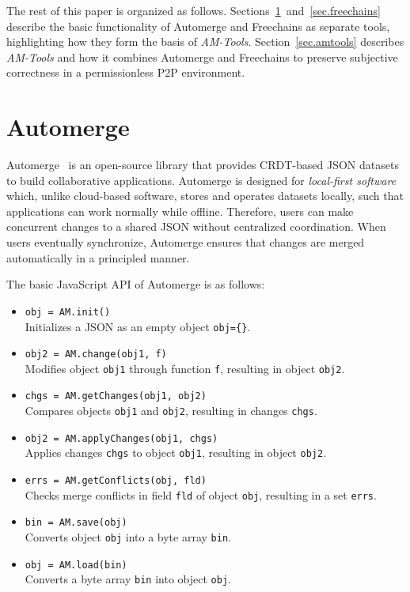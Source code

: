 \documentclass[12pt]{article}
\newcommand{\AMT}      {\emph{AM-Tools}\xspace}
\newcommand{\code}[1]  {\texttt{\footnotesize{#1}}}
\begin{document}
The rest of this paper is organized as follows.
Sections~\ref{sec.automerge}~and~\ref{sec.freechains} describe the basic
functionality of Automerge and Freechains as separate tools, highlighting how
they form the basis of \AMT.
Section~\ref{sec.amtools} describes \AMT and how it combines Automerge and
Freechains to preserve subjective correctness in a permissionless P2P
environment.

\section{Automerge}
\label{sec.automerge}

Automerge~\cite{p2p.automerge} is an open-source library that provides
CRDT-based JSON datasets to build collaborative applications.
%
Automerge is designed for \emph{local-first software}~\cite{p2p.local} which,
unlike cloud-based software, stores and operates datasets locally, such that
applications can work normally while offline.
%
Therefore, users can make concurrent changes to a shared JSON without
centralized coordination.
When users eventually synchronize, Automerge ensures that changes are merged
automatically in a principled manner.
%
%

The basic JavaScript API of Automerge is as follows:

\begin{itemize}
\item \code{obj = AM.init()} \\
    Initializes a JSON as an empty object \code{obj=\{\}}.
\item \code{obj2 = AM.change(obj1, f)} \\
    Modifies object \code{obj1} through function \code{f}, resulting in
    object \code{obj2}.
\item \code{chgs = AM.getChanges(obj1, obj2)} \\
    Compares objects \code{obj1} and \code{obj2}, resulting in changes
    \code{chgs}.
\item \code{obj2 = AM.applyChanges(obj1, chgs)} \\
    Applies changes \code{chgs} to object \code{obj1}, resulting in object
    \code{obj2}.
\item \code{errs = AM.getConflicts(obj, fld)} \\
    Checks merge conflicts in field \code{fld} of object \code{obj}, resulting
    in a set \code{errs}.
\item \code{bin = AM.save(obj)} \\
    Converts object \code{obj} into a byte array \code{bin}.
\item \code{obj = AM.load(bin)} \\
    Converts a byte array \code{bin} into object \code{obj}.
\end{itemize}
\end{document}

